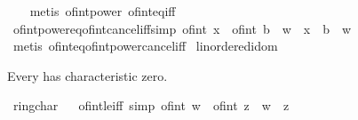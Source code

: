 \begin{isabellebody}
%
\isadelimproof
\ \ %
\endisadelimproof
%
\isatagproof
{}\isamarkupfalse%
\ {\isacharparenleft}{\kern0pt}metis\ of{\isacharunderscore}{\kern0pt}int{\isacharunderscore}{\kern0pt}power\ of{\isacharunderscore}{\kern0pt}int{\isacharunderscore}{\kern0pt}eq{\isacharunderscore}{\kern0pt}iff{\isacharparenright}{\kern0pt}%
\endisatagproof
{\isafoldproof}%
%
\isadelimproof
\isanewline
%
\endisadelimproof
\isanewline
{}\isamarkupfalse%
\ of{\isacharunderscore}{\kern0pt}int{\isacharunderscore}{\kern0pt}power{\isacharunderscore}{\kern0pt}eq{\isacharunderscore}{\kern0pt}of{\isacharunderscore}{\kern0pt}int{\isacharunderscore}{\kern0pt}cancel{\isacharunderscore}{\kern0pt}iff{\isacharbrackleft}{\kern0pt}simp{\isacharbrackright}{\kern0pt}{\isacharcolon}{\kern0pt}\ {\isachardoublequoteopen}of{\isacharunderscore}{\kern0pt}int\ x\ {\isacharequal}{\kern0pt}\ {\isacharparenleft}{\kern0pt}of{\isacharunderscore}{\kern0pt}int\ b{\isacharparenright}{\kern0pt}\ {\isacharcircum}{\kern0pt}\ w\ {\isasymlongleftrightarrow}\ x\ {\isacharequal}{\kern0pt}\ b\ {\isacharcircum}{\kern0pt}\ w{\isachardoublequoteclose}\isanewline
%
\isadelimproof
\ \ %
\endisadelimproof
%
\isatagproof
{}\isamarkupfalse%
\ {\isacharparenleft}{\kern0pt}metis\ of{\isacharunderscore}{\kern0pt}int{\isacharunderscore}{\kern0pt}eq{\isacharunderscore}{\kern0pt}of{\isacharunderscore}{\kern0pt}int{\isacharunderscore}{\kern0pt}power{\isacharunderscore}{\kern0pt}cancel{\isacharunderscore}{\kern0pt}iff{\isacharparenright}{\kern0pt}%
\endisatagproof
{\isafoldproof}%
%
\isadelimproof
\isanewline
%
\endisadelimproof
\isanewline
{}\isamarkupfalse%
\isanewline
\isanewline
{}\isamarkupfalse%
\ linordered{\isacharunderscore}{\kern0pt}idom\isanewline
{}%
\begin{isamarkuptext}%
Every  has characteristic zero.%
\end{isamarkuptext}\isamarkuptrue%
\isamarkupfalse%
\ ring{\isacharunderscore}{\kern0pt}char{\isacharunderscore}{\kern0pt}{}%
\isadelimproof
\ %
\endisadelimproof
%
\isatagproof
\isacommand{{\isachardot}{\kern0pt}{\isachardot}{\kern0pt}}\isamarkupfalse%
%
\endisatagproof
{\isafoldproof}%
%
\isadelimproof
%
\endisadelimproof
\isanewline
\isanewline
{}\isamarkupfalse%
\ of{\isacharunderscore}{\kern0pt}int{\isacharunderscore}{\kern0pt}le{\isacharunderscore}{\kern0pt}iff\ {\isacharbrackleft}{\kern0pt}simp{\isacharbrackright}{\kern0pt}{\isacharcolon}{\kern0pt}\ {\isachardoublequoteopen}of{\isacharunderscore}{\kern0pt}int\ w\ {\isasymle}\ of{\isacharunderscore}{\kern0pt}int\ z\ {\isasymlongleftrightarrow}\ w\ {\isasymle}\ z{\isachardoublequoteclose}\isanewline

\end{isabellebody}
